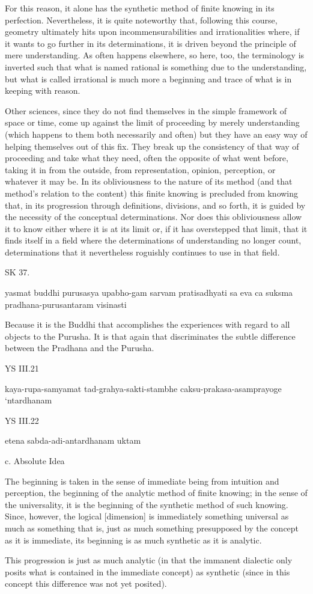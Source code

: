 For this reason, it alone has the
synthetic method of finite knowing in its perfection.
Nevertheless, it is quite noteworthy that, following this course, geometry ultimately
hits upon incommensurabilities and irrationalities where, if it wants
to go further in its determinations,
it is driven beyond the principle of mere understanding.
As often happens elsewhere, so here, too,
the terminology is inverted such that what is named rational is
something due to the understanding,
but what is called irrational is much more a beginning and
trace of what is in keeping with reason.

Other sciences, since they do not find themselves in the simple framework
of space or time, come up against the limit of proceeding by merely understanding
(which happens to them both necessarily and often)
but they have an easy way of helping themselves out of this fix.
They break up the consistency of that way of proceeding and take what they need, often
the opposite of what went before, taking it in from the outside, from
representation, opinion, perception, or whatever it may be.
In its obliviousness to the nature of its method
(and that method's relation to the content)
this finite knowing is precluded from knowing that,
in its progression through definitions, divisions, and so forth,
it is guided by the necessity of the conceptual determinations.
Nor does this obliviousness allow it to know either where it is at its limit or,
if it has overstepped that limit, that it finds itself in a field where the
determinations of understanding no longer count,
determinations that it nevertheless roguishly continues to use in that field.

SK 37.

yasmat buddhi purusasya upabho-gam sarvam pratisadhyati
sa eva ca suksma pradhana-purusantaram visinasti

Because it is the Buddhi that accomplishes the experiences
with regard to all objects to the Purusha.
It is that again that discriminates the subtle difference
between the Pradhana and the Purusha.

YS III.21

kaya-rupa-samyamat tad-grahya-sakti-stambhe caksu-prakasa-asamprayoge ‘ntardhanam

YS III.22

etena sabda-adi-antardhanam uktam

c. Absolute Idea

The beginning is taken in the sense of immediate being
from intuition and perception,
the beginning of the analytic method of finite knowing;
in the sense of the universality,
it is the beginning of the synthetic method of such knowing.
Since, however, the logical [dimension] is immediately something
universal as much as something that is,
just as much something presupposed by the concept as it is immediate,
its beginning is as much synthetic as it is analytic.

This progression is just
as much analytic
(in that the immanent dialectic only posits
what is contained in the immediate concept)
as synthetic
(since in this concept this difference was not yet posited).
